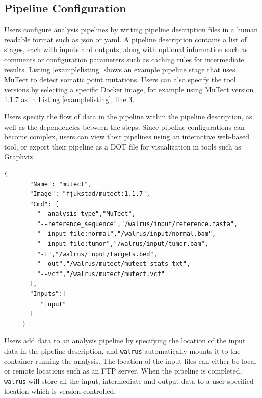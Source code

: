 \subsection{Pipeline Configuration}
Users configure analysis pipelines by writing pipeline description files in a
human readable format such as \gls{json} or \gls{yaml}. A pipeline description
contains a list of stages, each with inputs and outputs, along with optional
information such as comments or configuration parameters such as caching rules
for intermediate results. Listing \ref{examplelisting} shows an example pipeline
stage that uses MuTect\cite{mutect} to detect somatic point mutations. Users
can also specify the tool versions by selecting a specific Docker image, for
example using MuTect version 1.1.7 as in Listing \ref{examplelisting}, line 3. 

Users specify the flow of data in the pipeline within the pipeline description,
as well as the dependencies between the steps. Since pipeline configurations can
become complex, users can view their pipelines using an interactive web-based
tool, or export their pipeline as a DOT file for visualization in tools such as
Graphviz.\cite{ellson2001graphviz}

\begin{lstlisting}[caption={Example pipeline stage for a tool that detects
somatic point mutations. It reads a reference sequence file together with both
tumor and normal sequences, and produces an output file with the detected
mutations.},
label={examplelisting}, 
basicstyle=\ttfamily\scriptsize]
     {
       "Name": "mutect",
       "Image": "fjukstad/mutect:1.1.7",
       "Cmd": [
         "--analysis_type","MuTect",
         "--reference_sequence","/walrus/input/reference.fasta",
         "--input_file:normal","/walrus/input/normal.bam",
         "--input_file:tumor","/walrus/input/tumor.bam",
         "-L","/walrus/input/targets.bed",
         "--out","/walrus/mutect/mutect-stats-txt",
         "--vcf","/walrus/mutect/mutect.vcf"
       ],
       "Inputs":[
          "input" 
       ]
     }
\end{lstlisting}

Users add data to an analysis pipeline by specifying the location of the
input data in the pipeline description, and \texttt{walrus} automatically mounts
it to the container running the analysis. The location of the input files can
either be local or remote locations such as an FTP server. When the pipeline is
completed, \texttt{walrus} will store all the input, intermediate and output
data to a user-specified location which is version controlled. 

